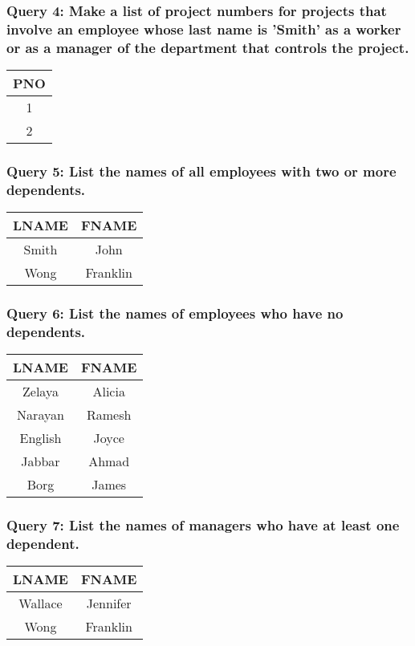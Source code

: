 \subsubsection*{Query 4: Make a list of project numbers for projects that involve an employee whose last name is 'Smith' as a worker or as a manager of the department that controls the project.}
\begin{center}
\begin{tabular}{ c }
  PNO \\ \hline
  1 \\
  2 \\
\end{tabular}
\end{center}

\subsubsection*{Query 5: List the names of all employees with two or more dependents.}
\begin{center}
\begin{tabular}{ c | c }
  LNAME & FNAME \\ \hline
  Smith & John \\
  Wong & Franklin \\
\end{tabular}
\end{center}

\subsubsection*{Query 6: List the names of employees who have no dependents.}
\begin{center}
\begin{tabular}{ c | c }
  LNAME & FNAME \\ \hline
  Zelaya & Alicia \\
  Narayan & Ramesh \\
  English & Joyce \\
  Jabbar & Ahmad \\
  Borg & James \\
\end{tabular}
\end{center}

\subsubsection*{Query 7: List the names of managers who have at least one dependent.}
\begin{center}
\begin{tabular}{ c | c }
  LNAME & FNAME \\ \hline
  Wallace & Jennifer \\
  Wong & Franklin \\
\end{tabular}
\end{center}

